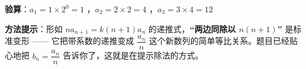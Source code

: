 \begin{answer}
\textbf{验算}：$a_1=1\times2^{0}=1$ ，$a_2=2\times2=4$ ，$a_3=3\times4=12$ 

\begin{gktip}
\textbf{方法提示}：形如 $na_{n+1}=k(n+1)a_n$ 的递推式，\textbf{“两边同除以 $n(n+1)$”} 是标准变形 —— 它把带系数的递推变成 $\dfrac{a_n}n$ 这个新数列的简单等比关系。题目已经贴心地把 $b_n=\dfrac{a_n}n$ 告诉你了，这就是在提示除法的方式。
\end{gktip}




\par\medskip

\end{answer}
